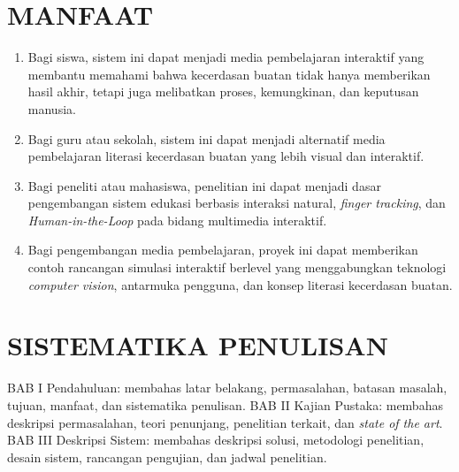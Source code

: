 \documentclass[12pt,a4paper,oneside,openany]{report}
\begin{document}
\section{MANFAAT}
\label{sec:manfaat}

\begin{enumerate}
    \item Bagi siswa, sistem ini dapat menjadi media pembelajaran interaktif yang membantu memahami bahwa kecerdasan buatan tidak hanya memberikan hasil akhir, tetapi juga melibatkan proses, kemungkinan, dan keputusan manusia.
    \item Bagi guru atau sekolah, sistem ini dapat menjadi alternatif media pembelajaran literasi kecerdasan buatan yang lebih visual dan interaktif.
    \item Bagi peneliti atau mahasiswa, penelitian ini dapat menjadi dasar pengembangan sistem edukasi berbasis interaksi natural, \textit{finger tracking}, dan \textit{Human-in-the-Loop} pada bidang multimedia interaktif.
    \item Bagi pengembangan media pembelajaran, proyek ini dapat memberikan contoh rancangan simulasi interaktif berlevel yang menggabungkan teknologi \textit{computer vision}, antarmuka pengguna, dan konsep literasi kecerdasan buatan.
\end{enumerate}

\section{SISTEMATIKA PENULISAN}
\label{sec:sistematika-penulisan}

BAB I Pendahuluan: membahas latar belakang, permasalahan, batasan masalah, tujuan, manfaat, dan sistematika penulisan. BAB II Kajian Pustaka: membahas deskripsi permasalahan, teori penunjang, penelitian terkait, dan \textit{state of the art}. BAB III Deskripsi Sistem: membahas deskripsi solusi, metodologi penelitian, desain sistem, rancangan pengujian, dan jadwal penelitian.

\end{document}

